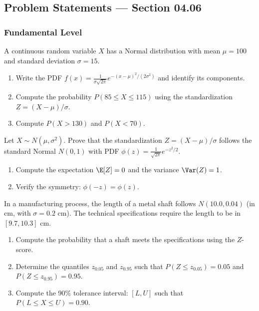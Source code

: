 \subsection*{Problem Statements --- Section 04.06}

\subsubsection*{Fundamental Level}

\begin{problema}
	\label{prob:4.6.1}
	A continuous random variable $X$ has a Normal distribution with mean $\mu = 100$ and standard deviation $\sigma = 15$.
	\begin{enumerate}
		\item Write the PDF $f(x) = \frac{1}{\sigma\sqrt{2\pi}} e^{-(x-\mu)^{2}/(2\sigma^{2})}$ and identify its components.
		\item Compute the probability $P(85 \le X \le 115)$ using the standardization $Z = (X - \mu)/\sigma$.
		\item Compute $P(X > 130)$ and $P(X < 70)$.
	\end{enumerate}
\end{problema}

\begin{problema}
	\label{prob:4.6.2}
	Let $X \sim N(\mu, \sigma^{2})$. Prove that the standardization $Z = (X - \mu)/\sigma$ follows the standard Normal $N(0, 1)$ with PDF $\phi(z) = \frac{1}{\sqrt{2\pi}} e^{-z^{2}/2}$.
	\begin{enumerate}
		\item Compute the expectation $\E[Z] = 0$ and the variance $\Var(Z) = 1$.
		\item Verify the symmetry: $\phi(-z) = \phi(z)$.
	\end{enumerate}
\end{problema}

\begin{problema}
	\label{prob:4.6.3}
	In a manufacturing process, the length of a metal shaft follows $N(10.0, 0.04)$ (in cm, with $\sigma = 0.2$ cm). The technical specifications require the length to be in $[9.7, 10.3]$ cm.
	\begin{enumerate}
		\item Compute the probability that a shaft meets the specifications using the $Z$-score.
		\item Determine the quantiles $z_{0.05}$ and $z_{0.95}$ such that $P(Z \le z_{0.05}) = 0.05$ and $P(Z \le z_{0.95}) = 0.95$.
		\item Compute the 90\% tolerance interval: $[L, U]$ such that $P(L \le X \le U) = 0.90$.
	\end{enumerate}
\end{problema}

